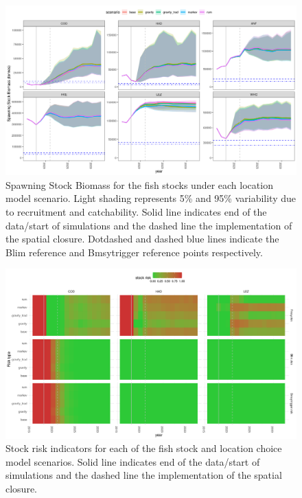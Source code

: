 \documentclass[12pt, halfline, a4paper]{ouparticle}
\begin{document}
\begin{figure}[!ht]
	\centering
	\includegraphics[width=1\linewidth]{figures/SSB_difference}
	\caption{Spawning Stock Biomass for the fish stocks under each location
		model scenario. Light shading represents 5\% and 95\%
		variability due to recruitment and catchability. Solid line
		indicates end of the data/start of simulations and the dashed
		line the implementation of the spatial closure.  Dotdashed and
		dashed blue lines indicate the Blim reference and Bmsytrigger
		reference points respectively.} 
	\label{fig:SSB}
\end{figure}	

\begin{figure}[!ht]
	\centering
	\includegraphics[width=1\linewidth]{figures/stock_risks}
	\caption{Stock risk indicators for each of the fish stock and location
		choice model scenarios. Solid
		line indicates end of the data/start of simulations and the
		dashed line the implementation of the spatial closure.} 
	\label{fig:risk}
\end{figure}	
\end{document}
